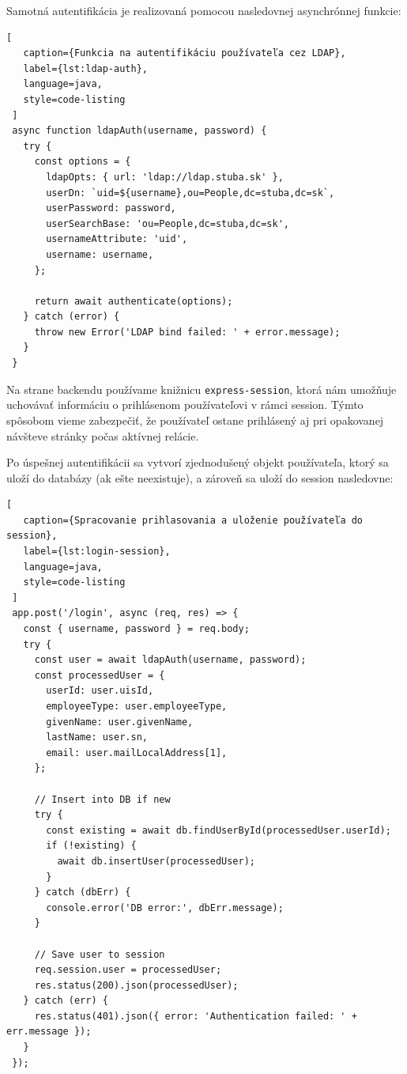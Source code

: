  Samotná autentifikácia je realizovaná pomocou nasledovnej asynchrónnej funkcie:
 
 \begin{lstlisting}[
   caption={Funkcia na autentifikáciu používateľa cez LDAP},
   label={lst:ldap-auth},
   language=java,
   style=code-listing
 ]
 async function ldapAuth(username, password) {
   try {
     const options = {
       ldapOpts: { url: 'ldap://ldap.stuba.sk' },
       userDn: `uid=${username},ou=People,dc=stuba,dc=sk`,
       userPassword: password,
       userSearchBase: 'ou=People,dc=stuba,dc=sk',
       usernameAttribute: 'uid',
       username: username,
     };
 
     return await authenticate(options);
   } catch (error) {
     throw new Error('LDAP bind failed: ' + error.message);
   }
 }
 \end{lstlisting}
 
 Na strane backendu používame knižnicu \texttt{express-session}, ktorá nám umožňuje uchovávať informáciu o prihlásenom používateľovi v rámci session. Týmto spôsobom vieme zabezpečiť, že používateľ ostane prihlásený aj pri opakovanej návšteve stránky počas aktívnej relácie.
 
 Po úspešnej autentifikácii sa vytvorí zjednodušený objekt používateľa, ktorý sa uloží do databázy (ak ešte neexistuje), a zároveň sa uloží do session nasledovne:
 
 \begin{lstlisting}[
   caption={Spracovanie prihlasovania a uloženie používateľa do session},
   label={lst:login-session},
   language=java,
   style=code-listing
 ]
 app.post('/login', async (req, res) => {
   const { username, password } = req.body;
   try {
     const user = await ldapAuth(username, password);
     const processedUser = {
       userId: user.uisId,
       employeeType: user.employeeType,
       givenName: user.givenName,
       lastName: user.sn,
       email: user.mailLocalAddress[1],
     };
 
     // Insert into DB if new
     try {
       const existing = await db.findUserById(processedUser.userId);
       if (!existing) {
         await db.insertUser(processedUser);
       }
     } catch (dbErr) {
       console.error('DB error:', dbErr.message);
     }
 
     // Save user to session
     req.session.user = processedUser;
     res.status(200).json(processedUser);
   } catch (err) {
     res.status(401).json({ error: 'Authentication failed: ' + err.message });
   }
 });
 \end{lstlisting}
 
